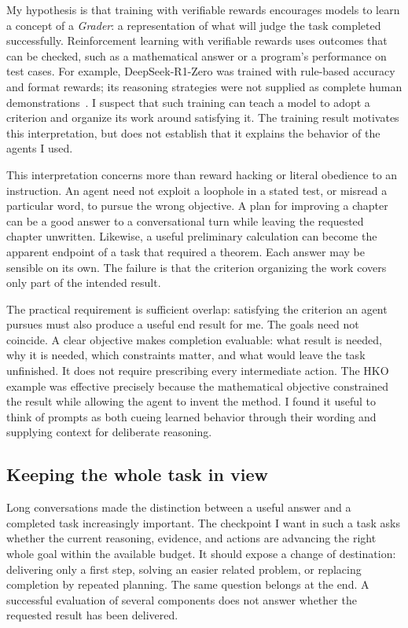My hypothesis is that training with verifiable rewards encourages models to
learn a concept of a \emph{Grader}: a representation of what will judge the
task completed successfully. Reinforcement learning with verifiable rewards
uses outcomes that can be checked, such as a mathematical answer or a
program's performance on test cases. For example, DeepSeek-R1-Zero was
trained with rule-based accuracy and format rewards; its reasoning strategies
were not supplied as complete human demonstrations~\cite{aiGuo2025}.
I suspect that such training can teach a model to adopt a criterion and
organize its work around satisfying it. The training result motivates this
interpretation, but does not establish that it explains the behavior of the
agents I used.

This interpretation concerns more than reward hacking or literal obedience
to an instruction. An agent need not exploit a loophole in a stated test, or
misread a particular word, to pursue the wrong objective. A plan for improving
a chapter can be a good answer to a conversational turn while leaving the
requested chapter unwritten. Likewise, a useful preliminary calculation can
become the apparent endpoint of a task that required a theorem. Each answer
may be sensible on its own. The failure is that the criterion organizing the
work covers only part of the intended result.

The practical requirement is sufficient overlap: satisfying the criterion an
agent pursues must also produce a useful end result for me. The goals need
not coincide. A clear objective makes completion evaluable: what result is
needed, why it is needed, which constraints matter, and what would leave the
task unfinished. It does not require prescribing
every intermediate action. The HKO example was effective precisely because
the mathematical objective constrained the result while allowing the agent
to invent the method. I found it useful to think of prompts as both cueing
learned behavior through their wording and supplying context for deliberate
reasoning.

\subsection{Keeping the whole task in view}

Long conversations made the distinction between a useful answer and a
completed task increasingly important. The checkpoint I want in such a task
asks whether the current reasoning,
evidence, and actions are advancing the right whole goal within the available
budget. It should expose a change of destination: delivering only a first
step, solving an easier related problem, or replacing completion by repeated
planning. The same question belongs at the end. A successful evaluation of
several components does not answer whether the requested result has been
delivered.

